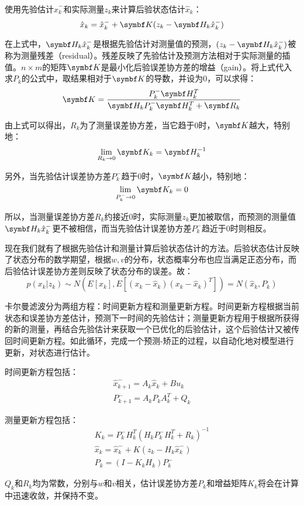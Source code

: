   使用先验估计$\hat{x}^{-}_k$和实际测量$z_k$来计算后验状态估计$\hat{x}_k$：
$$\hat{x}_k = \hat{x}^{-}_k + \mat{K} (z_k - \mat{H}_k \hat{x}^{-}_k)$$

  在上式中，$\mat{H}_k \hat{x}^{-}_k$是根据先验估计对测量值的预测，$(z_k - \mat{H}_k \hat{x}^{-}_k)$被称为测量残差（residual）。残差反映了先验估计及预测方法相对于实际测量的插值。$n\times m$的矩阵$\mat{K}$是最小化后验误差协方差的增益（gain）。将上式代入求$P_k$的公式中，取结果相对于$\mat{K}$的导数，并设为0，可以求得：
$$\mat{K}=\frac{P^{-}_k \mat{H}^T_k}{\mat{H}_k P^{-}_k \mat{H}^T_k + \mat{R}_k}$$

  由上式可以得出，$R_k$为了测量误差协方差，当它趋于0时，$\mat{K}$越大，特别地：
$$\lim_{R_k \to 0} \mat{K}_k=\mat{H}^{-1}_k$$

  另外，当先验估计误差协方差$P^{-}_k$趋于0时，$\mat{K}$越小，特别地：
$$\lim_{P^{-}_k \to 0} \mat{K}_k=0$$

  所以，当测量误差协方差$R_k$约接近0时，实际测量$z_k$更加被取信，而预测的测量值$\mat{H}_k \hat{x}^{-}_k$更不被相信，而当先验估计误差协方差$P^{-}_k$趋近于0时则相反。
  
  现在我们就有了根据先验估计和测量计算后验状态估计的方法。后验状态估计反映了状态分布的数学期望，根据$w,v$的分布，状态概率分布也应当满足正态分布，而后验估计误差协方差则反映了状态分布的误差。故：
$$p(x_k|z_k)\sim N(E[x_k],E[(x_k-\hat{x}_k)(x_k-\hat{x}_k)^T])=N(\hat{x}_k,P_k)$$

  卡尔曼滤波分为两组方程：时间更新方程和测量更新方程。时间更新方程根据当前状态和误差协方差估计，预测下一时间的先验估计；测量更新方程用于根据所获得的新的测量，再结合先验估计来获取一个已优化的后验估计，这个后验估计又被传回时间更新方程。如此循环，完成一个预测-矫正的过程，以自动化地对模型进行更新，对状态进行估计。

  时间更新方程包括：
\begin{gather*}
\hat{x}^{-}_{k+1}=A_k \hat{x}_k + B u_k \\
P^{-}_{k+1}=A_k P_k A^T_k + Q_k
\end{gather*}

  测量更新方程包括：
\begin{gather*}
K_k=P^{-}_k H^T_k(H_k P^{-}_k H^T_k + R_k)^{-1} \\
\hat{x}_k = \hat{x}^{-}_k + K (z_k - H_k \hat{x}^{-}_k) \\
P_k = (I-K_k H_k)P^{-}_k
\end{gather*}

  $Q_k$和$R_k$均为常数，分别与$w$和$v$相关，估计误差协方差$P_k$和增益矩阵$K_k$将会在计算中迅速收敛，并保持不变。

